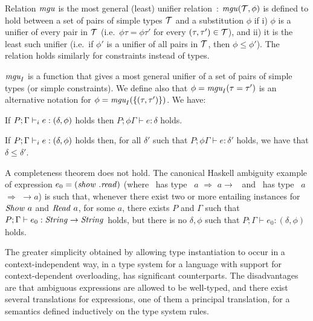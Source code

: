 Relation $\rm{\it mgu\/}$ is the most general (least) unifier
relation~\cite{Robinson65}: $\rm{\it mgu\/}(\cal T,\phi)$ is defined to hold
between a set of pairs of simple types $\cal T$ and a substitution
$\phi$ if i) $\phi$ is a unifier of every pair in $\cal T$ (i.e.~$\phi
\tau = \phi\tau'$ for every $(\tau,\tau')\in \cal T$), and ii) it is the
least such unifier (i.e.~if $\phi'$ is a unifier of all pairs in
$\cal T$, then $\phi\leq \phi'$). The relation holds similarly for
constraints instead of types.

$\mbox{\it mgu}_I$ is a function that gives a most general unifier of a set of
pairs of simple types (or simple constraints). We define also that
$\phi = \mbox{\it mgu}_I(\tau = \tau')$ is an alternative notation for
$\phi = \mbox{\it mgu}_I(\{(\tau, \tau')\})$. We have:

\begin{Theorem}[Soundness]

If $P;\Gamma \vdash_i e: (\delta,\phi)$ holds then $P;\phi\Gamma \vdash e: \delta$ holds.

\label{thm:type-inference-sound}
\end{Theorem}

\begin{Theorem}

If $P;\Gamma \vdash_i e: (\delta,\phi)$ holds then, for all $\delta'$ such
that $P;\phi\Gamma \vdash e: \delta'$ holds, we have that $\delta \leq
\delta'$.

\label{thm:principal-type}
\end{Theorem}

A completeness theorem does not hold. The canonical Haskell ambiguity
example of expression $e_0 = ({\it show\/}\ . {\it read\/})$ (where \sshow\ has
type \SShow\ $a$ $\Rightarrow$ $a \rightarrow$ \String\ and
\rread\ has type \RRead\ $a$ $\Rightarrow$ \String $\rightarrow a$) is
such that, whenever there exist two or more entailing instances for
${\it Show\/}\ a$ and ${\it Read\/}\ a$, for some $a$, there exists $P$ and
$\Gamma$ such that $P;\Gamma \vdash e_0: {\it String\/} \rightarrow {\it String\/}$
holds, but there is no $\delta,\phi$ such that $P;\Gamma \vdash e_0:
(\delta,\phi)$ holds.

The greater simplicity obtained by allowing type instantiation to
occur in a context-independent way, in a type system for a language
with support for context-dependent overloading, has significant
counterparts. The disadvantages are that ambiguous expressions are
allowed to be well-typed, and there exist several translations for
expressions, one of them a principal translation, for a semantics
defined inductively on the type system rules.

